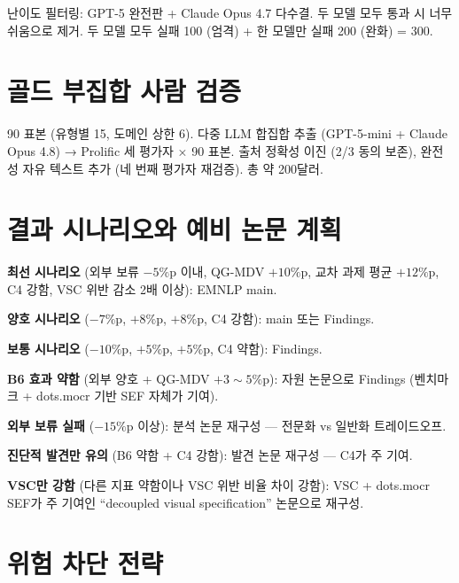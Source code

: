 \documentclass[11pt]{article}
\begin{document}
난이도 필터링: GPT-5 완전판 + Claude Opus 4.7 다수결. 두 모델 모두 통과 시 너무 쉬움으로 제거. 두 모델 모두 실패 100 (엄격) + 한 모델만 실패 200 (완화) = 300.

\section{골드 부집합 사람 검증}

90 표본 (유형별 15, 도메인 상한 6). 다중 LLM 합집합 추출 (GPT-5-mini + Claude Opus 4.8) → Prolific 세 평가자 × 90 표본. 출처 정확성 이진 (2/3 동의 보존), 완전성 자유 텍스트 추가 (네 번째 평가자 재검증). 총 약 200달러.

\section{결과 시나리오와 예비 논문 계획}
\label{sec:scenarios}

\textbf{최선 시나리오} (외부 보류 $-5\%$p 이내, QG-MDV $+10\%$p, 교차 과제 평균 $+12\%$p, C4 강함, VSC 위반 감소 2배 이상): EMNLP main.

\textbf{양호 시나리오} ($-7\%$p, $+8\%$p, $+8\%$p, C4 강함): main 또는 Findings.

\textbf{보통 시나리오} ($-10\%$p, $+5\%$p, $+5\%$p, C4 약함): Findings.

\textbf{B6 효과 약함} (외부 양호 + QG-MDV $+3\sim5\%$p): 자원 논문으로 Findings (벤치마크 + dots.mocr 기반 SEF 자체가 기여).

\textbf{외부 보류 실패} ($-15\%$p 이상): 분석 논문 재구성 — 전문화 vs 일반화 트레이드오프.

\textbf{진단적 발견만 유의} (B6 약함 + C4 강함): 발견 논문 재구성 — C4가 주 기여.

\textbf{VSC만 강함} (다른 지표 약함이나 VSC 위반 비율 차이 강함): VSC + dots.mocr SEF가 주 기여인 ``decoupled visual specification'' 논문으로 재구성.

\section{위험 차단 전략}
\end{document}
